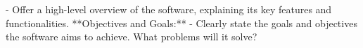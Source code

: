   - Offer a high-level overview of the software, explaining its key features and functionalities.
 **Objectives and Goals:**
   - Clearly state the goals and objectives the software aims to achieve. What problems will it solve?